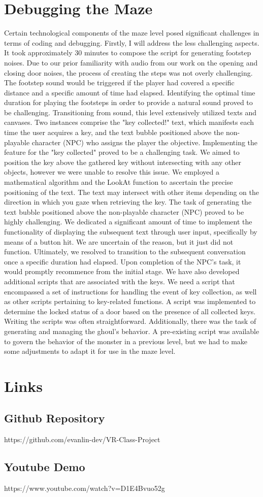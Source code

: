 \documentclass{vgtc}                          %
\begin{document}
\section{Debugging the Maze}
Certain technological components of the maze level posed significant challenges in terms of coding and debugging. Firstly, I will address the less challenging aspects. It took approximately 30 minutes to compose the script for generating footstep noises. Due to our prior familiarity with audio from our work on the opening and closing door noises, the process of creating the steps was not overly challenging. The footstep sound would be triggered if the player had covered a specific distance and a specific amount of time had elapsed. Identifying the optimal time duration for playing the footsteps in order to provide a natural sound proved to be challenging. Transitioning from sound, this level extensively utilized texts and canvases. Two instances comprise the "key collected!" text, which manifests each time the user acquires a key, and the text bubble positioned above the non-playable character (NPC) who assigns the player the objective. Implementing the feature for the "key collected" proved to be a challenging task. We aimed to position the key above the gathered key without intersecting with any other objects, however we were unable to resolve this issue. We employed a mathematical algorithm and the LookAt function to ascertain the precise positioning of the text. The text may intersect with other items depending on the direction in which you gaze when retrieving the key. The task of generating the text bubble positioned above the non-playable character (NPC) proved to be highly challenging. We dedicated a significant amount of time to implement the functionality of displaying the subsequent text through user input, specifically by means of a button hit. We are uncertain of the reason, but it just did not function. Ultimately, we resolved to transition to the subsequent conversation once a specific duration had elapsed. Upon completion of the NPC's task, it would promptly recommence from the initial stage. We have also developed additional scripts that are associated with the keys. We need a script that encompassed a set of instructions for handling the event of key collection, as well as other scripts pertaining to key-related functions. A script was implemented to determine the locked status of a door based on the presence of all collected keys. Writing the scripts was often straightforward. Additionally, there was the task of generating and managing the ghoul's behavior. A pre-existing script was available to govern the behavior of the monster in a previous level, but we had to make some adjustments to adapt it for use in the maze level.

\section{Links}
\subsection* {Github Repository}
https://github.com/evanlin-dev/VR-Class-Project
\subsection*{Youtube Demo}
https://www.youtube.com/watch?v=D1E4Bvuo52g
\end{document}
